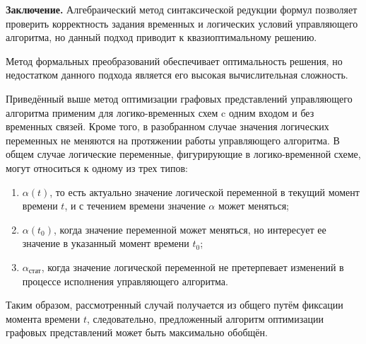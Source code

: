 \textbf{Заключение.} Алгебраический метод синтаксической редукции формул
позволяет проверить корректность задания временных и логических условий
управляющего алгоритма,  но данный подход приводит к квазиоптимальному
решению.

Метод формальных преобразований обеспечивает оптимальность решения,  но
недостатком данного подхода является его высокая вычислительная сложность.

Приведённый выше метод оптимизации графовых представлений управляющего
алгоритма применим для логико-временных схем c одним входом и без временных
связей. Кроме того,  в разобранном случае значения логических переменных не
меняются на протяжении работы управляющего алгоритма. В общем случае
логические переменные,  фигурирующие в логико-временной схеме,  могут
относиться к одному из трех типов:
\begin{enumerate}
\item $\alpha (t) $, то есть актуально значение логической переменной в текущий момент времени $t$,  и с течением времени значение $\alpha $ может меняться;
\item $\alpha (t_0 ) $, когда значение переменной может меняться,  но интересует ее значение в указанный момент времени $t_0 $;
\item $\alpha _{\text{стат}} $, когда значение логической переменной не претерпевает изменений в процессе исполнения управляющего алгоритма.
\end{enumerate}

Таким образом,  рассмотренный случай получается из общего путём фиксации
момента времени $t$,  следовательно,  предложенный алгоритм оптимизации
графовых представлений может быть максимально обобщён.

